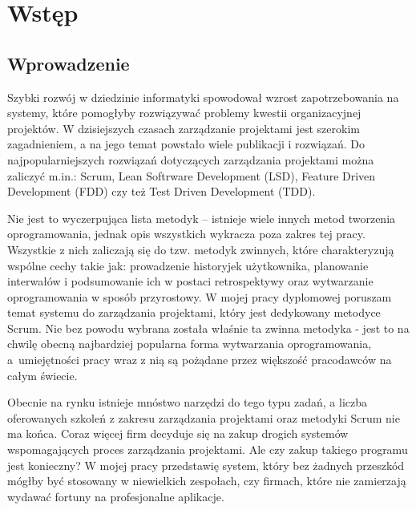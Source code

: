 \chapter{Wstęp}
\section{Wprowadzenie}
Szybki rozwój w dziedzinie informatyki spowodował wzrost zapotrzebowania na systemy, które pomogłyby rozwiązywać problemy kwestii organizacyjnej projektów. W dzisiejszych czasach zarządzanie projektami jest szerokim zagadnieniem, a na jego temat powstało wiele publikacji i rozwiązań. Do najpopularniejszych rozwiązań dotyczących zarządzania projektami można zaliczyć m.in.: Scrum, Lean Softrware Development (LSD), Feature Driven Development (FDD) czy też Test Driven Development (TDD). 

Nie jest to wyczerpująca lista metodyk -- istnieje wiele innych metod tworzenia oprogramowania, jednak opis wszystkich wykracza poza zakres tej pracy. Wszystkie z nich zaliczają się do tzw. metodyk zwinnych, które charakteryzują wspólne cechy takie jak: prowadzenie historyjek użytkownika, planowanie interwałów i podsumowanie ich w postaci retrospektywy oraz wytwarzanie oprogramowania w sposób przyrostowy. W mojej pracy dyplomowej poruszam temat systemu do zarządzania projektami, który jest dedykowany metodyce Scrum. Nie bez powodu wybrana została właśnie ta zwinna metodyka - jest to na chwilę obecną najbardziej popularna forma wytwarzania oprogramowania, a~umiejętności pracy wraz z nią są pożądane przez większość pracodawców na całym świecie. 

Obecnie na rynku istnieje mnóstwo narzędzi do tego typu zadań, a liczba oferowanych szkoleń z zakresu zarządzania projektami oraz metodyki Scrum nie ma końca. Coraz więcej firm decyduje się na zakup drogich systemów wspomagających proces zarządzania projektami. Ale czy zakup takiego programu jest konieczny? W mojej pracy przedstawię system, który bez żadnych przeszkód mógłby być stosowany w niewielkich zespołach, czy firmach, które nie zamierzają wydawać fortuny na profesjonalne aplikacje.

